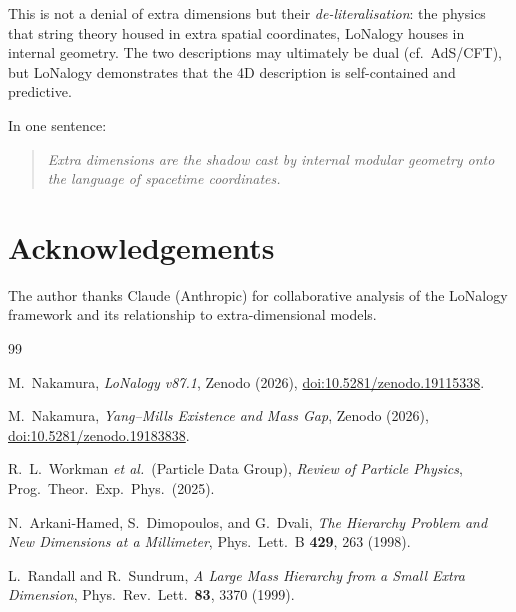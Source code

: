 \documentclass[12pt]{article}
\theoremstyle{plain}
\theoremstyle{definition}
\numberwithin{equation}{section}
\begin{document}
This is not a denial of extra dimensions but their
\emph{de-literalisation}: the physics that string theory housed in
extra spatial coordinates, LoNalogy houses in internal geometry.
The two descriptions may ultimately be dual (cf.\ AdS/CFT), but
LoNalogy demonstrates that the 4D description is self-contained
and predictive.

In one sentence:
\begin{quote}
\emph{Extra dimensions are the shadow cast by internal
modular geometry onto the language of spacetime coordinates.}
\end{quote}


\section*{Acknowledgements}

The author thanks Claude (Anthropic) for collaborative analysis
of the LoNalogy framework and its relationship to extra-dimensional
models.


\begin{thebibliography}{99}

M.~Nakamura,
\textit{LoNalogy v87.1},
Zenodo (2026),
\href{https://doi.org/10.5281/zenodo.19115338}{doi:10.5281/zenodo.19115338}.

M.~Nakamura,
\textit{Yang--Mills Existence and Mass Gap},
Zenodo (2026),
\href{https://doi.org/10.5281/zenodo.19183838}{doi:10.5281/zenodo.19183838}.

R.~L.~Workman \textit{et al.}\ (Particle Data Group),
\textit{Review of Particle Physics},
Prog.\ Theor.\ Exp.\ Phys.\ (2025).

N.~Arkani-Hamed, S.~Dimopoulos, and G.~Dvali,
\textit{The Hierarchy Problem and New Dimensions at a Millimeter},
Phys.\ Lett.\ B \textbf{429}, 263 (1998).

L.~Randall and R.~Sundrum,
\textit{A Large Mass Hierarchy from a Small Extra Dimension},
Phys.\ Rev.\ Lett.\ \textbf{83}, 3370 (1999).

\end{thebibliography}
\end{document}

